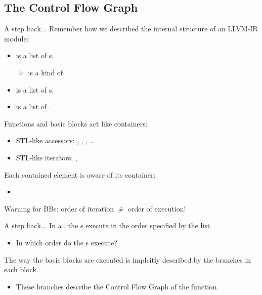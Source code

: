 
\subsection{The Control Flow Graph}


\begin{frame}{A step back...}
Remember how we described the internal structure of an LLVM-IR module:
\begin{itemize}
\item {} is a list of s.
	\begin{itemize}
	\item {} is a kind of .
	\end{itemize}
\item {} is a list of s.
\item {} is a list of .
\end{itemize}
\bigskip
Functions and basic blocks act like containers:

\begin{itemize}
\item STL-like accessors: , ,
      , \ldots
\item STL-like iterators: , 
\end{itemize}

\vfill
Each contained element is aware of its container:
\begin{itemize}
\item {}
\end{itemize}
\vfill
Warning for BBs: order of iteration $\neq$ order of execution!
\end{frame}


\begin{frame}{A step back...}
In a , the s execute
in the order specified by the list.\\
\begin{itemize}
\item In which order do the s execute?
\end{itemize}
\bigskip
The way the basic blocks are executed is implcitly described by
the \alert{branches} in each block.\\
\begin{itemize}
\item These branches describe the \alert{Control Flow Graph} of the function.
\end{itemize}
\end{frame}


